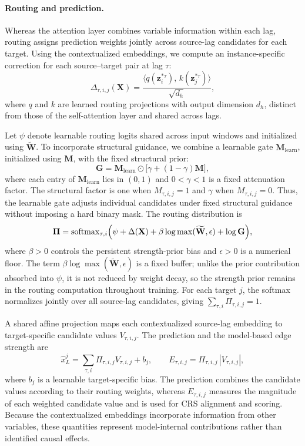 \documentclass[letterpaper]{article}
\newcommand{\Wt}{\widetilde{\mathbf{W}}}
\begin{document}
\paragraph{Routing and prediction.}
Whereas the attention layer combines variable information within each lag, routing assigns prediction weights jointly across source-lag candidates for each target. Using the contextualized embeddings, we compute an instance-specific correction for each source--target pair at lag $\tau$:
\begin{equation}
\Delta_{\tau,i,j}(\mathbf{X})=\frac{\langle q(\mathbf{z}^{*\tau}_i),\,k(\mathbf{z}^{*\tau}_j)\rangle}{\sqrt{d_h}},
\label{eq:delta}
\end{equation}
where $q$ and $k$ are learned routing projections with output dimension $d_h$, distinct from those of the self-attention layer and shared across lags.

Let $\psi$ denote learnable routing logits shared across input windows and initialized using $\Wt$. To incorporate structural guidance, we combine a learnable gate $\mathbf{M}_{\mathrm{learn}}$, initialized using $\mathbf{M}$, with the fixed structural prior:
\begin{equation}
\mathbf{G}=\mathbf{M}_{\mathrm{learn}}\odot\bigl[\gamma+(1-\gamma)\mathbf{M}\bigr],
\label{eq:gate}
\end{equation}
where each entry of $\mathbf{M}_{\mathrm{learn}}$ lies in $(0,1)$ and $0<\gamma<1$ is a fixed attenuation factor. The structural factor is one when $M_{\tau,i,j}=1$ and $\gamma$ when $M_{\tau,i,j}=0$. Thus, the learnable gate adjusts individual candidates under fixed structural guidance without imposing a hard binary mask. The routing distribution is
\begin{equation}
\bm{\Pi}=\mathrm{softmax}_{\tau,i}\Bigl(\psi+\Delta(\mathbf{X})+\beta\log\max(\Wt,\epsilon)+\log\mathbf{G}\Bigr),
\label{eq:routing}
\end{equation}
where $\beta>0$ controls the persistent strength-prior bias and $\epsilon>0$ is a numerical floor. The term $\beta\log\max(\Wt,\epsilon)$ is a fixed buffer; unlike the prior contribution absorbed into $\psi$, it is not reduced by weight decay, so the strength prior remains in the routing computation throughout training. For each target $j$, the softmax normalizes jointly over all source-lag candidates, giving $\sum_{\tau,i}\Pi_{\tau,i,j}=1$.

A shared affine projection maps each contextualized source-lag embedding to target-specific candidate values $V_{\tau,i,j}$. The prediction and the model-based edge strength are
\begin{equation}
\hat{x}^j_L=\sum_{\tau,i}\Pi_{\tau,i,j}V_{\tau,i,j}+b_j,\qquad E_{\tau,i,j}=\Pi_{\tau,i,j}\,|V_{\tau,i,j}|,
\label{eq:pred}
\end{equation}
where $b_j$ is a learnable target-specific bias. The prediction combines the candidate values according to their routing weights, whereas $E_{\tau,i,j}$ measures the magnitude of each weighted candidate value and is used for CRS alignment and scoring. Because the contextualized embeddings incorporate information from other variables, these quantities represent model-internal contributions rather than identified causal effects.
\end{document}
